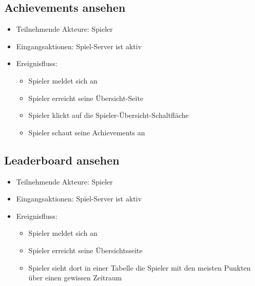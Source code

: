 \documentclass[a4paper]{scrreprt}
\begin{document}
	    \subsection{Achievements ansehen}
    \begin{itemize}
        \item Teilnehmende Akteure: \Gls{Spieler}
        \item Eingangsaktionen: \Gls{Spiel-Server} ist aktiv
        \item Ereignisfluss:
        \begin{itemize}
            \item \Gls{Spieler} meldet sich an
            \item \Gls{Spieler} erreicht seine Übersicht-Seite
            \item \Gls{Spieler} klickt auf die Spieler-Übersicht-Schaltfläche
            \item \Gls{Spieler} schaut seine Achievements an
        \end{itemize}
    \end{itemize}

    \subsection{Leaderboard ansehen}
    \begin{itemize}
        \item Teilnehmende Akteure: \Gls{Spieler}
        \item Eingangsaktionen: \Gls{Spiel-Server} ist aktiv
        \item Ereignisfluss:
        \begin{itemize}
            \item \Gls{Spieler} meldet sich an
            \item \Gls{Spieler} erreicht seine Übersichtsseite
            \item \Gls{Spieler} sieht dort in einer Tabelle die \Gls{Spieler} mit den meisten Punkten über einen gewissen Zeitraum
        \end{itemize}
    \end{itemize}

    \newpage
\end{document}

